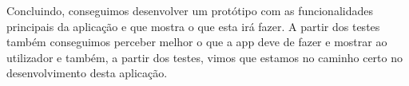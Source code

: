 \documentclass[conference]{IEEEtran}
\begin{document}
Concluindo, conseguimos desenvolver um protótipo com as funcionalidades principais da aplicação e que mostra o que esta irá fazer. A partir dos testes também conseguimos perceber melhor o que a app deve de fazer e mostrar ao utilizador e também, a partir dos testes, vimos que estamos no caminho certo no desenvolvimento desta aplicação.



\end{document}
